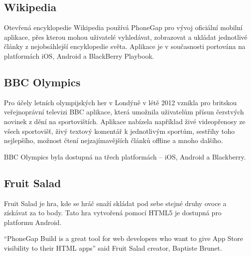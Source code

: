 \subsection{Wikipedia}
Otevřená encyklopedie Wikipedia používá PhoneGap pro vývoj oficiální mobilní aplikace, přes kterou mohou uživatelé vyhledávat, zobrazovat a ukládat jednotlivé články z nejobsáhlejší encyklopedie světa. Aplikace je v současnosti portována na platformách iOS, Android a BlackBerry Playbook.


\subsection{BBC Olympics}
Pro účely letních olympijských her v Londýně v létě 2012 vznikla pro britskou veřejnoprávní televizi BBC aplikace, která umožnila uživatelům přísun čerstvých novinek z dění na sportovištích. Aplikace nabízela například živé videopřenosy ze všech sportovišť, živý textový komentář k jednotlivým sportům, sestřihy toho nejlepšího, možnost čtení nejzajímavějších článků offline a mnoho dalšího. \cite{phonegap_bbc_olympics_app}

BBC Olympics byla dostupná na třech platformách – iOS, Android a Blackberry.


\subsection{Fruit Salad}
Fruit Salad je hra, kde se hráč snaží skládat pod sebe stejné druhy ovoce a získávat za to body. Tato hra vytvořená pomocí HTML5 je dostupná pro platformu Android.

“PhoneGap Build is a great tool for web developers who want to give App Store visibility to their HTML apps” said Fruit Salad creator, Baptiste Brunet. \cite{phonegap_fruit_salad}


